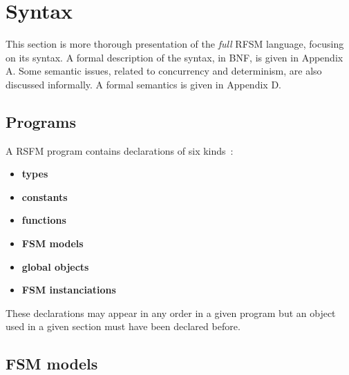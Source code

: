 \chapter{Syntax}
\label{cha:syntax}

This section is more thorough presentation of the \emph{full} RFSM language, focusing on its syntax.
A formal description of the syntax, in BNF, is given in Appendix A.
Some semantic issues, related to concurrency and determinism, are also discussed informally. A
formal semantics is given in Appendix D.

\section{Programs}
\label{sec:programs}

A RSFM program contains declarations of six kinds~: 
\begin{itemize}
\item \textbf{types}
\item \textbf{constants}
\item \textbf{functions}
\item \textbf{FSM models}
\item \textbf{global objects}
\item \textbf{FSM instanciations}
\end{itemize}

These declarations may appear in any order in a given program but an object used in a given section must
have been declared before. 

\section{FSM models}
\label{sec:fsm-models}


